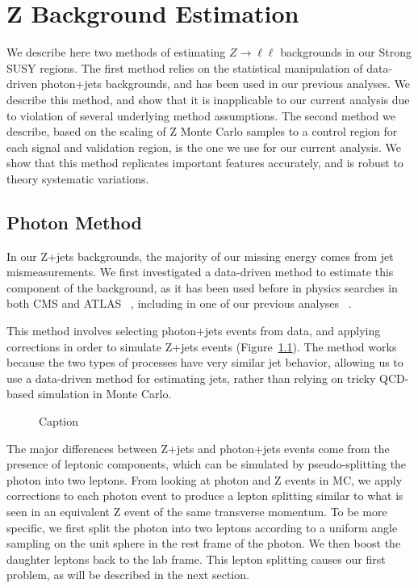 \chapter{Z Background Estimation}

We describe here two methods of estimating $Z\rightarrow\ell\ell$ backgrounds in our Strong SUSY regions. The first method relies on the statistical manipulation of data-driven photon+jets backgrounds, and has been used in our previous analyses. We describe this method, and show that it is inapplicable to our current analysis due to violation of several underlying method assumptions. The second method we describe, based on the scaling of Z Monte Carlo samples to a \mindphijm control region for each signal and validation region, is the one we use for our current analysis. We show that this method replicates important features accurately, and is robust to theory systematic variations.

\section{Photon Method}

In our Z+jets backgrounds, the majority of our missing energy comes from jet mismeasurements. We first investigated a data-driven method to estimate this component of the background, as it has been used before in physics searches in both CMS and ATLAS ~\cite{blah}, including in one of our previous analyses ~\cite{blah}.

This method involves selecting photon+jets events from data, and applying corrections in order to simulate Z+jets events (Figure~\ref{fig:photon_to_Z}). The method works because the two types of processes have very similar jet behavior, allowing us to use a data-driven method for estimating jets, rather than relying on tricky QCD-based simulation in Monte Carlo.

\begin{figure}
    \centering
    \caption{Caption}
    \label{fig:photon_to_Z}
\end{figure}

The major differences between Z+jets and photon+jets events come from the presence of leptonic components, which can be simulated by pseudo-splitting the photon into two leptons. From looking at photon and Z events in MC, we apply corrections to each photon event to produce a lepton splitting similar to what is seen in an equivalent Z event of the same transverse momentum. To be more specific, we first split the photon into two leptons according to a uniform angle sampling on the unit sphere in the rest frame of the photon. We then boost the daughter leptons back to the lab frame. This lepton splitting causes our first problem, as will be described in the next section.

